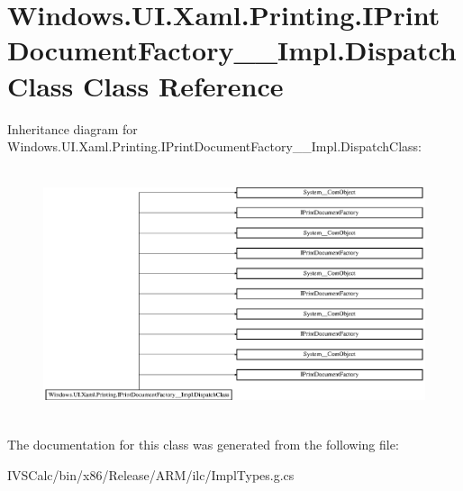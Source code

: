 \hypertarget{class_windows_1_1_u_i_1_1_xaml_1_1_printing_1_1_i_print_document_factory_____impl_1_1_dispatch_class}{}\section{Windows.\+U\+I.\+Xaml.\+Printing.\+I\+Print\+Document\+Factory\+\_\+\+\_\+\+Impl.\+Dispatch\+Class Class Reference}
\label{class_windows_1_1_u_i_1_1_xaml_1_1_printing_1_1_i_print_document_factory_____impl_1_1_dispatch_class}
Inheritance diagram for Windows.\+U\+I.\+Xaml.\+Printing.\+I\+Print\+Document\+Factory\+\_\+\+\_\+\+Impl.\+Dispatch\+Class\+:\begin{figure}[H]
\begin{center}
\leavevmode
\includegraphics[height=7.386091cm]{class_windows_1_1_u_i_1_1_xaml_1_1_printing_1_1_i_print_document_factory_____impl_1_1_dispatch_class}
\end{center}
\end{figure}


The documentation for this class was generated from the following file\+:\begin{DoxyCompactItemize}
\item 
I\+V\+S\+Calc/bin/x86/\+Release/\+A\+R\+M/ilc/Impl\+Types.\+g.\+cs\end{DoxyCompactItemize}
